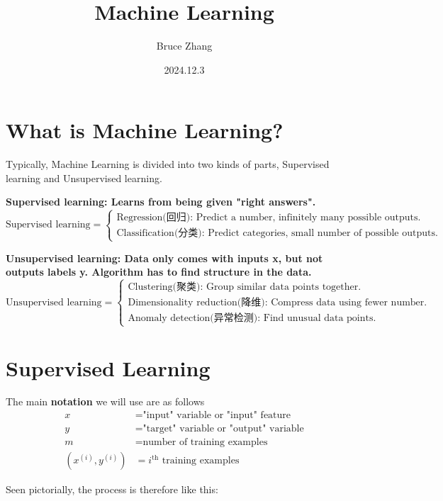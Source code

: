 \documentclass[fontset=windows,pass]{article}
\title{\heiti\zihao{2} Machine Learning}
\author{\songti Bruce Zhang}
\date{2024.12.3}
\numberwithin{equation}{subsection} %
\begin{document}
	\maketitle
	\thispagestyle{empty}

\tableofcontents

\newpage
\section{What is Machine Learning?}
Typically, Machine Learning is divided into two kinds of parts, Supervised learning and
Unsupervised learning.

\textbf{Supervised learning: Learns from being given "right answers".}
\[
\text{Supervised learning} =
\begin{cases}
\text{Regression(回归): Predict a number, infinitely many possible outputs.}\\
\text{Classification(分类): Predict categories, small number of possible outputs.}
\end{cases}
\]

\textbf{Unsupervised learning: Data only comes with inputs x, but not outputs labels y. Algorithm
has to find structure in the data.}
\[
\text{Unsupervised learning} = 
\begin{cases}
	\text{Clustering(聚类): Group similar data points together.}\\
	\text{Dimensionality reduction(降维): Compress data using fewer number.}\\
	\text{Anomaly detection(异常检测): Find unusual data points.}
\end{cases}
\]

\section{Supervised Learning}
The main \textbf{notation} we will use are as follows
\begin{align*}
	x & = \text{"input" variable or "input" feature} \\
	y & = \text{"target" variable or "output" variable} \\
	m & = \text{number of training examples} \\
	(x^{(i)}, y^{(i)}) & = \text{$i^{\text{th}}$ training examples}
\end{align*}

Seen pictorially, the process is therefore like this:
\end{document}
